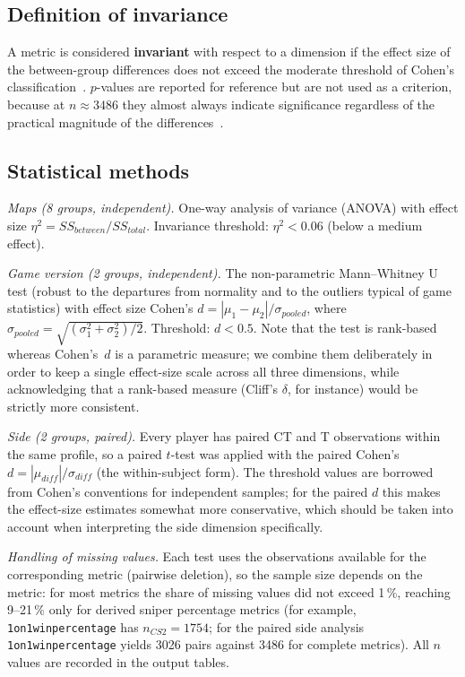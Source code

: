 \subsection{Definition of invariance}

A metric is considered \textbf{invariant} with respect to a dimension if the effect size of the
between-group differences does not exceed the moderate threshold of Cohen's
classification~\cite{Cohen}. $p$-values are reported for reference but are not used as a
criterion, because at $n \approx 3486$ they almost always indicate significance regardless of the
practical magnitude of the differences~\cite{Cohen,Sullivan}.

\subsection{Statistical methods}

\textit{Maps (8 groups, independent).} One-way analysis of variance (ANOVA) with effect size
$\eta^2 = SS_{between} / SS_{total}$. Invariance threshold: $\eta^2 < 0.06$ (below a medium
effect).

\textit{Game version (2 groups, independent).} The non-parametric Mann--Whitney U test (robust to
the departures from normality and to the outliers typical of game statistics) with effect size
Cohen's $d = |\mu_1 - \mu_2| / \sigma_{pooled}$, where
$\sigma_{pooled} = \sqrt{(\sigma_1^2 + \sigma_2^2)/2}$. Threshold: $d < 0.5$. Note that the test
is rank-based whereas Cohen's~$d$ is a parametric measure; we combine them deliberately in order
to keep a single effect-size scale across all three dimensions, while acknowledging that a
rank-based measure (Cliff's $\delta$, for instance) would be strictly more consistent.

\textit{Side (2 groups, paired).} Every player has paired CT and T observations within the same
profile, so a paired $t$-test was applied with the paired
Cohen's $d = |\mu_{diff}| / \sigma_{diff}$ (the within-subject form). The threshold values are
borrowed from Cohen's conventions for independent samples; for the paired $d$ this makes the
effect-size estimates somewhat more conservative, which should be taken into account when
interpreting the side dimension specifically.

\textit{Handling of missing values.} Each test uses the observations available for the
corresponding metric (pairwise deletion), so the sample size depends on the metric: for most
metrics the share of missing values did not exceed 1\,\%, reaching 9--21\,\% only for derived
sniper percentage metrics (for example, \texttt{1on1\us{}win\us{}percentage} has
$n_{CS2} = 1754$; for the paired side analysis \texttt{1on1\us{}win\us{}percentage} yields 3026
pairs against 3486 for complete metrics). All $n$ values are recorded in the output tables.

